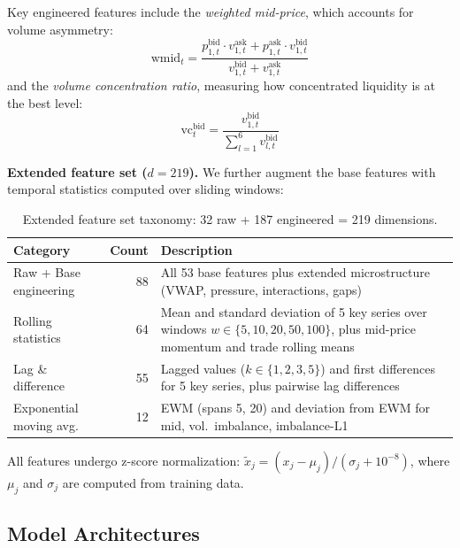 \documentclass[11pt,a4paper]{article}
\begin{document}
Key engineered features include the \emph{weighted mid-price}, which accounts for volume asymmetry:
\begin{equation}
    \text{wmid}_t = \frac{p_{1,t}^{\text{bid}} \cdot v_{1,t}^{\text{ask}} + p_{1,t}^{\text{ask}} \cdot v_{1,t}^{\text{bid}}}{v_{1,t}^{\text{bid}} + v_{1,t}^{\text{ask}}}
    \label{eq:wmid}
\end{equation}
and the \emph{volume concentration ratio}, measuring how concentrated liquidity is at the best level:
\begin{equation}
    \text{vc}_t^{\text{bid}} = \frac{v_{1,t}^{\text{bid}}}{\sum_{l=1}^{6} v_{l,t}^{\text{bid}}}
    \label{eq:vol_conc}
\end{equation}

\textbf{Extended feature set ($d = 219$).} We further augment the base features with temporal statistics computed over sliding windows:

\begin{table}[h]
\centering
\small
\caption{Extended feature set taxonomy: 32 raw + 187 engineered = 219 dimensions.}
\label{tab:features_extended}
\begin{tabularx}{\textwidth}{@{}lrX@{}}
\toprule
\textbf{Category} & \textbf{Count} & \textbf{Description} \\
\midrule
Raw + Base engineering & 88 & All 53 base features plus extended microstructure (VWAP, pressure, interactions, gaps) \\
Rolling statistics & 64 & Mean and standard deviation of 5 key series over windows $w \in \{5, 10, 20, 50, 100\}$, plus mid-price momentum and trade rolling means \\
Lag \& difference & 55 & Lagged values ($k \in \{1,2,3,5\}$) and first differences for 5 key series, plus pairwise lag differences \\
Exponential moving avg. & 12 & EWM (spans 5, 20) and deviation from EWM for mid, vol.~imbalance, imbalance-L1 \\
\bottomrule
\end{tabularx}
\end{table}

All features undergo z-score normalization: $\tilde{x}_j = (x_j - \mu_j) / (\sigma_j + 10^{-8})$, where $\mu_j$ and $\sigma_j$ are computed from training data.


\subsection{Model Architectures}
\end{document}
